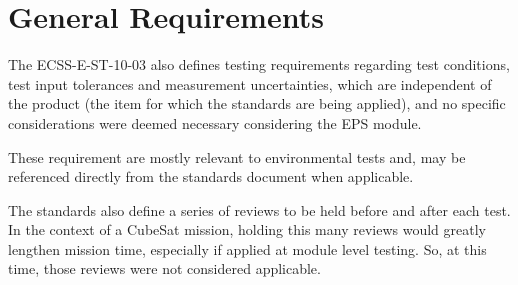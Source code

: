 %
%
%
%
%

%
%
%
%
%

\chapter{General Requirements} \label{ch:general-requirements}

The ECSS-E-ST-10-03 \cite{ecss-e-st-10-03} also defines testing requirements regarding test conditions, test input tolerances and measurement uncertainties, which are independent of the product (the item for which the standards are being applied), and no specific considerations were deemed necessary considering the EPS module.

These requirement are mostly relevant to environmental tests and, may be referenced directly from the standards document \cite{ecss-e-st-10-03} when applicable.

The standards also define a series of reviews to be held before and after each test.
In the context of a CubeSat mission, holding this many reviews would greatly lengthen mission time, especially if applied at module level testing.
So, at this time, those reviews were not considered applicable.